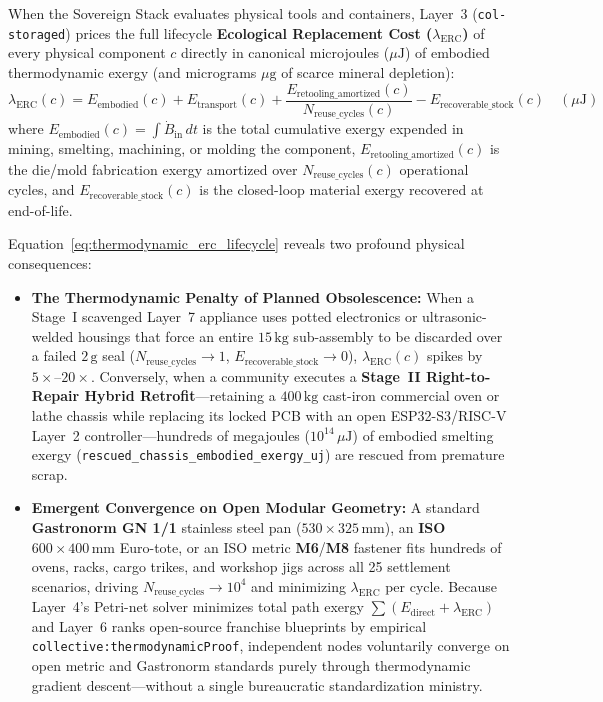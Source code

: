 When the Sovereign Stack evaluates physical tools and containers, Layer~3 (\texttt{col-storaged}) prices the full lifecycle \textbf{Ecological Replacement Cost ($\lambda_{\mathrm{ERC}}$)} of every physical component $c$ directly in canonical microjoules ($\mu\mathrm{J}$) of embodied thermodynamic exergy (and micrograms $\mu\mathrm{g}$ of scarce mineral depletion):
\begin{equation}
\lambda_{\mathrm{ERC}}(c) = E_{\mathrm{embodied}}(c) + E_{\mathrm{transport}}(c) + \frac{E_{\mathrm{retooling\_amortized}}(c)}{N_{\mathrm{reuse\_cycles}}(c)} - E_{\mathrm{recoverable\_stock}}(c) \quad (\mu\mathrm{J})
\label{eq:thermodynamic_erc_lifecycle}
\end{equation}
where $E_{\mathrm{embodied}}(c) = \int \dot{B}_{\mathrm{in}}\,dt$ is the total cumulative exergy expended in mining, smelting, machining, or molding the component, $E_{\mathrm{retooling\_amortized}}(c)$ is the die/mold fabrication exergy amortized over $N_{\mathrm{reuse\_cycles}}(c)$ operational cycles, and $E_{\mathrm{recoverable\_stock}}(c)$ is the closed-loop material exergy recovered at end-of-life.

Equation~\eqref{eq:thermodynamic_erc_lifecycle} reveals two profound physical consequences:
\begin{itemize}
    \item \textbf{The Thermodynamic Penalty of Planned Obsolescence:} When a Stage~I scavenged Layer~7 appliance uses potted electronics or ultrasonic-welded housings that force an entire $15\,\mathrm{kg}$ sub-assembly to be discarded over a failed $2\,\mathrm{g}$ seal ($N_{\mathrm{reuse\_cycles}} \to 1$, $E_{\mathrm{recoverable\_stock}} \to 0$), $\lambda_{\mathrm{ERC}}(c)$ spikes by $5\times\text{--}20\times$. Conversely, when a community executes a \textbf{Stage~II Right-to-Repair Hybrid Retrofit}---retaining a $400\,\mathrm{kg}$ cast-iron commercial oven or lathe chassis while replacing its locked PCB with an open ESP32-S3/RISC-V Layer~2 controller---hundreds of megajoules ($10^{14}\,\mu\mathrm{J}$) of embodied smelting exergy (\texttt{rescued\_chassis\_embodied\_exergy\_uj}) are rescued from premature scrap.
    \item \textbf{Emergent Convergence on Open Modular Geometry:} A standard \textbf{Gastronorm GN 1/1} stainless steel pan ($530 \times 325\,\mathrm{mm}$), an \textbf{ISO $600 \times 400\,\mathrm{mm}$} Euro-tote, or an ISO metric \textbf{M6}/\textbf{M8} fastener fits hundreds of ovens, racks, cargo trikes, and workshop jigs across all 25 settlement scenarios, driving $N_{\mathrm{reuse\_cycles}} \to 10^4$ and minimizing $\lambda_{\mathrm{ERC}}$ per cycle. Because Layer~4's Petri-net solver minimizes total path exergy $\sum(E_{\mathrm{direct}} + \lambda_{\mathrm{ERC}})$ and Layer~6 ranks open-source franchise blueprints by empirical \texttt{collective:thermodynamicProof}, independent nodes voluntarily converge on open metric and Gastronorm standards purely through thermodynamic gradient descent---without a single bureaucratic standardization ministry.
\end{itemize}

